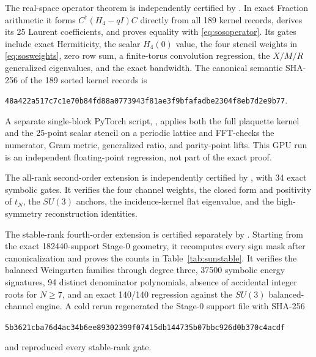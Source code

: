 \documentclass[11pt]{article}
\begin{document}
The real-space operator theorem is independently certified by
. In exact Fraction arithmetic
it forms $C^\dagger(H_4-qI)C$ directly from all 189 kernel records, derives
its 25 Laurent coefficients, and proves equality with
\eqref{eq:sosoperator}. Its gates include exact Hermiticity, the scalar
$H_4(0)$ value, the four stencil weights in \eqref{eq:sosweights}, zero row
sum, a finite-torus convolution regression, the $X/M/R$ generalized
eigenvalues, and the exact bandwidth. The canonical semantic SHA-256 of the
189 sorted kernel records is
\begin{center}
\texttt{48a422a517c7c1e70b84fd88a0773943f81ae3f9bfafadbe2304f8eb7d2e9b77}.
\end{center}
A separate single-block PyTorch script,
, applies both the full plaquette kernel and
the 25-point scalar stencil on a periodic lattice and FFT-checks the numerator,
Gram metric, generalized ratio, and parity-point lifts. This GPU run is an
independent floating-point regression, not part of the exact proof.

The all-rank second-order extension is independently certified by
, with 34 exact symbolic
gates. It verifies the four channel weights, the closed form and positivity
of $t_N$, the $SU(3)$ anchors, the incidence-kernel flat eigenvalue, and the
high-symmetry reconstruction identities.

The stable-rank fourth-order extension is certified separately by
. Starting from the exact 182440-support
Stage-0 geometry, it recomputes every sign mask after canonicalization and
proves the counts in Table~\ref{tab:sunstable}. It verifies the balanced
Weingarten families through degree three, 37500 symbolic energy signatures,
94 distinct denominator polynomials, absence of accidental integer roots for
$N\geq7$, and an exact 140/140 regression against the $SU(3)$ balanced-channel
engine. A cold rerun regenerated the Stage-0 support file with SHA-256
\begin{center}
\texttt{5b3621cba76d4ac34b6ee89302399f07415db144735b07bbc926d0b370c4acdf}
\end{center}
and reproduced every stable-rank gate.
\end{document}
